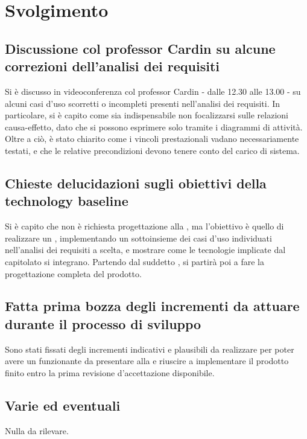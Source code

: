 \newpage
\section*{Svolgimento}

	\subsection*{Discussione col professor Cardin su alcune correzioni dell'analisi dei requisiti}
		Si è discusso in videoconferenza col professor Cardin - dalle 12.30 alle 13.00 - su alcuni casi d'uso scorretti o incompleti presenti nell'analisi dei requisiti. In particolare, si è capito come sia indispensabile non focalizzarsi sulle relazioni causa-effetto, dato che si possono esprimere solo tramite i diagrammi di attività.
		Oltre a ciò, è stato chiarito come i vincoli prestazionali vadano necessariamente testati, e che le relative precondizioni devono tenere conto del carico di sistema.

	\subsection*{Chieste delucidazioni sugli obiettivi della technology baseline}
		Si è capito che non è richiesta progettazione alla , ma l'obiettivo è quello di realizzare un , implementando un sottoinsieme dei casi d'uso individuati nell'analisi dei requisiti a scelta, e mostrare come le tecnologie implicate dal capitolato si integrano. Partendo dal suddetto , si partirà poi a fare la progettazione completa del prodotto.

	\subsection*{Fatta prima bozza degli incrementi da attuare durante il processo di sviluppo}
		Sono stati fissati degli incrementi indicativi e plausibili da realizzare per poter
		avere un  funzionante da presentare alla  e riuscire a implementare il prodotto finito entro la prima revisione d'accettazione disponibile.

	\subsection*{Varie ed eventuali}
		Nulla da rilevare.